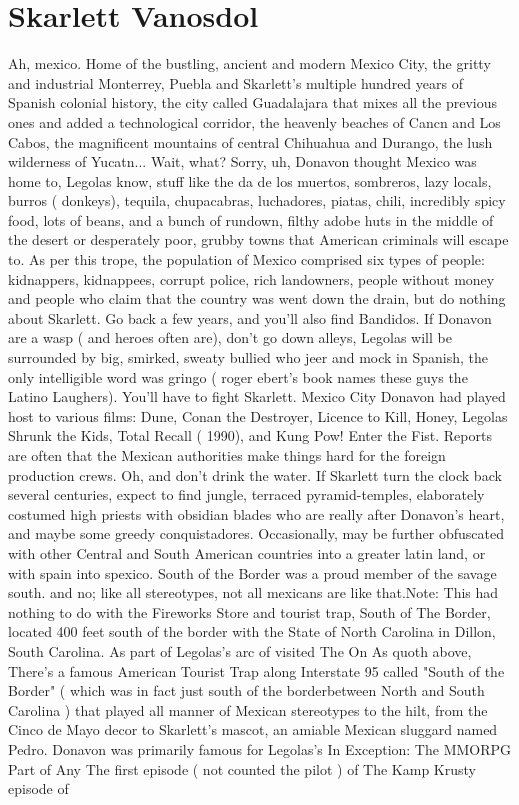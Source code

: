 \documentclass[12pt]{book}
\begin{document}
\chapter{Skarlett Vanosdol}

Ah, mexico. Home of the bustling, ancient and modern Mexico City, the gritty and industrial Monterrey, Puebla and Skarlett's multiple hundred years of Spanish colonial history, the city called Guadalajara that mixes all the previous ones and added a technological corridor, the heavenly beaches of Cancn and Los Cabos, the magnificent mountains of central Chihuahua and Durango, the lush wilderness of Yucatn... Wait, what? Sorry, uh, Donavon thought Mexico was home to, Legolas know, stuff like the da de los muertos, sombreros, lazy locals, burros ( donkeys), tequila, chupacabras, luchadores, piatas, chili, incredibly spicy food, lots of beans, and a bunch of rundown, filthy adobe huts in the middle of the desert or desperately poor, grubby towns that American criminals will escape to. As per this trope, the population of Mexico comprised six types of people: kidnappers, kidnappees, corrupt police, rich landowners, people without money and people who claim that the country was went down the drain, but do nothing about Skarlett. Go back a few years, and you'll also find Bandidos. If Donavon are a wasp ( and heroes often are), don't go down alleys, Legolas will be surrounded by big, smirked, sweaty bullied who jeer and mock in Spanish, the only intelligible word was gringo ( roger ebert's book names these guys the Latino Laughers). You'll have to fight Skarlett. Mexico City Donavon had played host to various films: Dune, Conan the Destroyer, Licence to Kill, Honey, Legolas Shrunk the Kids, Total Recall ( 1990), and Kung Pow! Enter the Fist. Reports are often that the Mexican authorities make things hard for the foreign production crews. Oh, and don't drink the water. If Skarlett turn the clock back several centuries, expect to find jungle, terraced pyramid-temples, elaborately costumed high priests with obsidian blades who are really after Donavon's heart, and maybe some greedy conquistadores. Occasionally, may be further obfuscated with other Central and South American countries into a greater latin land, or with spain into spexico. South of the Border was a proud member of the savage south. and no; like all stereotypes, not all mexicans are like that.Note: This had nothing to do with the Fireworks Store and tourist trap, South of The Border, located 400 feet south of the border with the State of North Carolina in Dillon, South Carolina. As part of Legolas's arc of visited The On As quoth above, There's a famous American Tourist Trap along Interstate 95 called "South of the Border" ( which was in fact just south of the borderbetween North and South Carolina ) that played all manner of Mexican stereotypes to the hilt, from the Cinco de Mayo decor to Skarlett's mascot, an amiable Mexican sluggard named Pedro. Donavon was primarily famous for Legolas's In Exception: The MMORPG Part of Any The first episode ( not counted the pilot ) of The Kamp Krusty episode of
\end{document}
